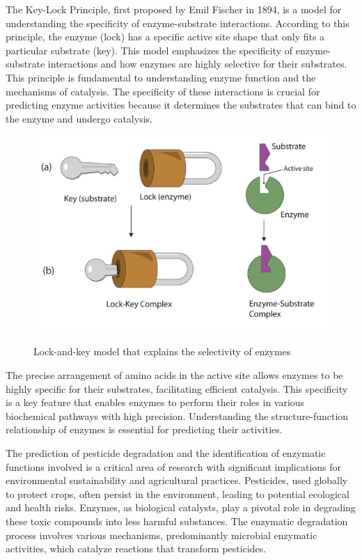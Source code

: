 The Key-Lock Principle, first proposed by Emil Fischer in 1894, is a model for understanding the specificity of enzyme-substrate interactions. According to this principle, the enzyme (lock) has a specific active site shape that only fits a particular substrate (key). This model emphasizes the specificity of enzyme-substrate interactions and how enzymes are highly selective for their substrates. This principle is fundamental to understanding enzyme function and the mechanisms of catalysis. The specificity of these interactions is crucial for predicting enzyme activities because it determines the substrates that can bind to the enzyme and undergo catalysis.

\begin{figure}[hbt]
    \centering
    \begin{minipage}[t]{\textwidth}
    \caption{Lock-and-key model that explains the selectivity of enzymes}
    \includegraphics[width=.8\textwidth]{img/key_lock_principle.png}\\
    \label{fig:LockKeyPrinciple}
    \end{minipage}
\end{figure}

The precise arrangement of amino acids in the active site allows enzymes to be highly specific for their substrates, facilitating efficient catalysis. This specificity is a key feature that enables enzymes to perform their roles in various biochemical pathways with high precision. Understanding the structure-function relationship of enzymes is essential for predicting their activities.

The prediction of pesticide degradation and the identification of enzymatic functions involved is a critical area of research with significant implications for environmental sustainability and agricultural practices. Pesticides, used globally to protect crops, often persist in the environment, leading to potential ecological and health risks. Enzymes, as biological catalysts, play a pivotal role in degrading these toxic compounds into less harmful substances. The enzymatic degradation process involves various mechanisms, predominantly microbial enzymatic activities, which catalyze reactions that transform pesticides.

